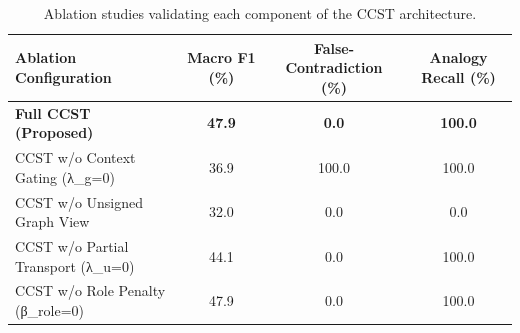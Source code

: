 \begin{table}[t]
\centering
\small
\caption{Ablation studies validating each component of the CCST architecture.}
\label{tab:ablations}
\begin{tabular}{lccc}
\toprule
\textbf{Ablation Configuration} & \textbf{Macro F1 (\%)} & \textbf{False-Contradiction (\%)} & \textbf{Analogy Recall (\%)} \\
\midrule
\textbf{Full CCST (Proposed)} & \textbf{47.9} & \textbf{0.0} & \textbf{100.0} \\
CCST w/o Context Gating (λ_g=0) & 36.9 & 100.0 & 100.0 \\
CCST w/o Unsigned Graph View & 32.0 & 0.0 & 0.0 \\
CCST w/o Partial Transport (λ_u=0) & 44.1 & 0.0 & 100.0 \\
CCST w/o Role Penalty (β_role=0) & 47.9 & 0.0 & 100.0 \\
\bottomrule
\end{tabular}
\end{table}
